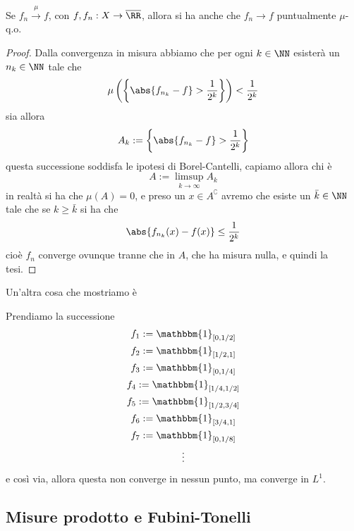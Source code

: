 \documentclass[11pt]{scrartcl}
\begin{document}
	\begin{proposition}
		Se $f_n\overset{\mu}{\to}f$, con $f,f_n:X\to \overline{\RR}$, allora si ha anche che $f_n\to f$ puntualmente $\mu$-q.o.
	\end{proposition}
	\begin{proof}
		Dalla convergenza in misura abbiamo che per ogni $k\in \NN$ esisterà un $n_k\in \NN$ tale che 
		$$\mu\left(\left\{\abs{f_{n_k}-f}>\frac{1}{2^k}\right\}\right)<\frac{1}{2^k}$$
		sia allora
		$$A_k:=\left\{\abs{f_{n_k}-f}>\frac{1}{2^k}\right\}$$
		questa successione soddisfa le ipotesi di Borel-Cantelli, capiamo allora chi è 
		$$A:=\limsup_{k\to\infty}A_k$$
		in realtà si ha che $\mu(A)=0$, e preso un $x\in A^\complement$ avremo che esiste un $\bar{k}\in \NN$ tale che se $k\ge \bar{k}$ si ha che 
		$$\abs{f_{n_k}(x)-f(x)}\le \frac{1}{2^k}$$
		cioè $f_n$ converge ovunque tranne che in $A$, che ha misura nulla, e quindi la tesi. 
	\end{proof}
	Un'altra cosa che mostriamo è
	\begin{example}
		Prendiamo la successione 
		\begin{gather*}
			f_1:= \mathbbm{1}_{[0,1/2]} \\
			f_2:= \mathbbm{1}_{[1/2,1]} \\
			f_3:= \mathbbm{1}_{[0,1/4]} \\
			f_4:= \mathbbm{1}_{[1/4,1/2]} \\
			f_5:= \mathbbm{1}_{[1/2,3/4]} \\
			f_6:= \mathbbm{1}_{[3/4,1]} \\
			f_7:= \mathbbm{1}_{[0,1/8]} \\
			\vdots
		\end{gather*}
		e così via, allora questa non converge in nessun punto, ma converge in $L^1$.
	\end{example}
	
	\newpage
	
	\subsection{Misure prodotto e Fubini-Tonelli}
	
\end{document}
